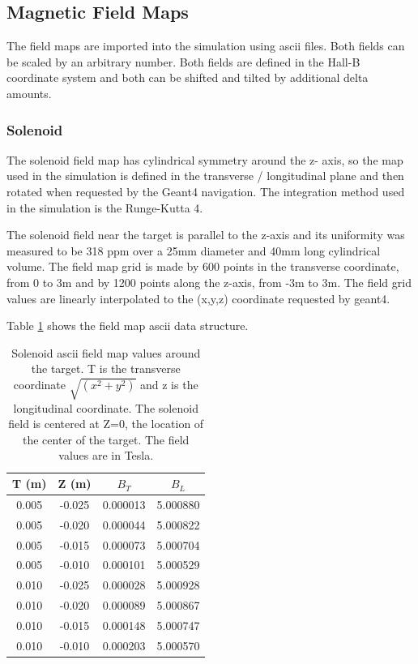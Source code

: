 \subsection{Magnetic Field Maps} \label{clas12FieldMaps}


The field maps are imported into the simulation using ascii files. Both fields can be scaled by an arbitrary number.
Both fields are defined in the Hall-B coordinate system and both can be shifted and tilted by additional delta amounts.

\subsubsection{Solenoid}
The solenoid field map has cylindrical symmetry around the z- axis, so the map used in the simulation is defined in the transverse / longitudinal plane
and then rotated when requested by the Geant4 navigation. The integration method used in the simulation is the Runge-Kutta 4.

The solenoid field near the target is parallel to the z-axis and its uniformity was measured to be 318 ppm over a 25mm diameter and 40mm long cylindrical volume.
The field map grid is made by 600 points in the transverse coordinate, from 0 to 3m and by 1200 points
along the z-axis, from \mbox{-3m} to 3m.
The field grid values are linearly interpolated to the (x,y,z) coordinate requested by geant4.

Table \ref{tab:solMap} shows the field map ascii data structure.


\begin{table}[h]
	\begin{center}
		\begin{tabular}{| c | c | c | c |}
			T (m)  & Z (m) &  $B_T $  & $ B_L $ \\
			\hline
          0.005  &  -0.025 & 0.000013  & 5.000880 \\
          0.005  &  -0.020 & 0.000044  & 5.000822 \\
          0.005  &  -0.015 & 0.000073  & 5.000704 \\
          0.005  &  -0.010 & 0.000101  & 5.000529 \\
          0.010  &  -0.025 & 0.000028  & 5.000928 \\
          0.010  &  -0.020 & 0.000089  & 5.000867 \\
          0.010  &  -0.015 & 0.000148  & 5.000747 \\
          0.010  &  -0.010 & 0.000203  & 5.000570 \\
		\end{tabular}
	\end{center}
\caption{Solenoid ascii field map values around the target. T is the transverse coordinate $\sqrt{(x^2+y^2)}$ and z is the longitudinal coordinate.
            The solenoid field is centered at Z=0, the location of the center of the target. The field values are in Tesla.}\label{tab:solMap}
\end{table}

